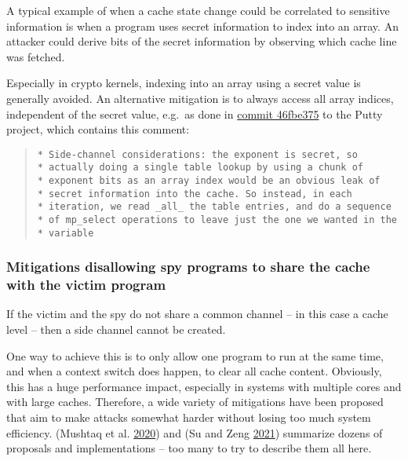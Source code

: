 \documentclass[a4paper,]{report}
\begin{document}
A typical example of when a cache state change could be correlated to
sensitive information is when a program uses secret information to index
into an array. An attacker could derive bits of the secret information
by observing which cache line was fetched.

Especially in crypto kernels, indexing into an array using a secret
value is generally avoided. An alternative mitigation is to always
access all array indices, independent of the secret value, e.g.~as done
in
\href{https://git.tartarus.org/?p=simon/putty.git;a=commitdiff;h=46fbe375bf}{commit
46fbe375} to the Putty project, which contains this comment:

\begin{quote}
\begin{verbatim}
* Side-channel considerations: the exponent is secret, so
* actually doing a single table lookup by using a chunk of
* exponent bits as an array index would be an obvious leak of
* secret information into the cache. So instead, in each
* iteration, we read _all_ the table entries, and do a sequence
* of mp_select operations to leave just the one we wanted in the
* variable
\end{verbatim}
\end{quote}

\hypertarget{mitigations-disallowing-spy-programs-to-share-the-cache-with-the-victim-program}{%
\subsubsection{Mitigations disallowing spy programs to share the cache
with the victim
program}\label{mitigations-disallowing-spy-programs-to-share-the-cache-with-the-victim-program}}

If the victim and the spy do not share a common channel -- in this case
a cache level -- then a side channel cannot be created.

One way to achieve this is to only allow one program to run at the same
time, and when a context switch does happen, to clear all cache content.
Obviously, this has a huge performance impact, especially in systems
with multiple cores and with large caches. Therefore, a wide variety of
mitigations have been proposed that aim to make attacks somewhat harder
without losing too much system efficiency. (Mushtaq et al.
\protect\hyperlink{ref-Mushtaq2020}{2020}) and (Su and Zeng
\protect\hyperlink{ref-Su2021}{2021}) summarize dozens of proposals and
implementations -- too many to try to describe them all here.
\end{document}
